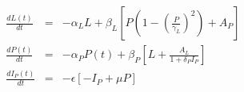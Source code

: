 \begin{eqnarray*}
  \frac{dL(t)}{dt} &=& -\alpha_{L}L + \beta_{L}\left[P\left(1-\left(\frac{P}{\gamma_{L}}\right)^{2}\right) + A_{P}\right] \\
  \frac{dP(t)}{dt} &=& -\alpha_{P}P(t) + \beta_{P}\left[L + \frac{A_{L}}{1+\delta_{P}I_{P}}\right] \\
  \frac{dI_{P}(t)}{dt} &=& -\epsilon [-I_{P} + \mu P]
\end{eqnarray*}

